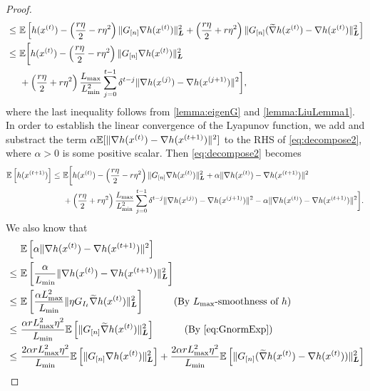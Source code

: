 \begin{proof}
\begin{align}
        ~\leq~&\mathbb{E}\left[ h(x^{(t)}) - \left( \frac{r \eta }{2} - r \eta^2 \right) \| G_{[n]} \nabla h(x^{(t)}) \|_{\boldsymbol{L}}^2 + \left( \frac{r \eta}{2} + r \eta^2 \right) \| G_{[n]} ( \widetilde{\nabla} h(x^{(t)}) - \nabla h(x^{(t)} ) \|_{\boldsymbol{L}}^2 \right] \nonumber \\
        ~\leq~&\mathbb{E}\bigg[ h(x^{(t)}) - \left( \frac{r \eta }{2} - r \eta^2 \right) \| G_{[n]} \nabla h(x^{(t)}) \|_{\boldsymbol{L}}^2 \nonumber
        \\&+ \left( \frac{r \eta}{2} + r \eta^2 \right) \frac{L_{\max}}{L_{\min}^2} \sum_{j=0}^{t-1} \delta^{t-j} \| \nabla h(x^{(j)}) - {\nabla} h(x^{(j+1)}) \|^2 \bigg], \label{eq:decompose2}
    \end{align}
    where the last inequality follows from \autoref{lemma:eigenG} and \autoref{lemma:LiuLemma1}. In order to establish the linear convergence of the Lyapunov function, we add and substract the term $\alpha \mathbb{E}[ \| \nabla h(x^{(t)}) - {\nabla} h(x^{(t+1)}) \|^2 ]$ to the RHS of \eqref{eq:decompose2}, where $\alpha > 0$ is some positive scalar. Then \eqref{eq:decompose2} becomes
    \begin{align}
        \mathbb{E}\left[ h(x^{(t+1)}) \right] \leq~ &\mathbb{E}\bigg[ h(x^{(t)}) - \left( \frac{r \eta }{2} - r \eta^2 \right) \| G_{[n]} \nabla h(x^{(t)}) \|_{\boldsymbol{L}}^2 + \alpha \| \nabla h(x^{(t)}) - {\nabla} h(x^{(t+1)}) \|^2 \nonumber \\
        &+ \left( \frac{r \eta}{2} + r \eta^2 \right) \frac{L_{\max}}{L_{\min}^2} \sum_{j=0}^{t-1} \delta^{t-j} \| \nabla h(x^{(j)}) - {\nabla} h(x^{(j+1)}) \|^2 - \alpha \| \nabla h(x^{(t)}) - {\nabla} h(x^{(t+1)}) \|^2 \bigg]. \label{eq:decompose3}
    \end{align}
    We also know that
    \begin{align*}
        &\mE \left[ \alpha \| \nabla h(x^{(t)}) - {\nabla} h(x^{(t+1)}) \|^2 \right] \\ 
        ~\leq~&  \mE \left[ \frac{\alpha}{L_{\min}} \| \nabla h(x^{(t)}) - {\nabla} h(x^{(t+1)}) \|_{\bL}^2 \right]  \\
        ~\leq~&  \mE \left[ \frac{\alpha L_{\max}^2}{L_{\min}} \| \eta G_{I_t} \wt{\nabla} h( x^{(t)} )  \|_{\bL}^2 \right]  \qquad \text{(By $L_{\max}$-smoothness of $h$)}  \\
        ~\leq~& \frac{\alpha r L_{\max}^2 \eta^2}{L_{\min}} \mE \left[  \| G_{[n]} \wt{\nabla} h( x^{(t)} )  \|_{\bL}^2 \right] \qquad \text{(By \eqref{eq:GnormExp})} \\
        ~\leq~&  \frac{2 \alpha r L_{\max}^2 \eta^2}{L_{\min}} \mE \left[ \| G_{[n]} \nabla h( x^{(t)} ) \|^2_{\bL} \right] + \frac{2 \alpha r L_{\max}^2 \eta^2}{L_{\min}} \mE \left[  \| G_{[n]} ( \wt{\nabla} h( x^{(t)} ) - \nabla h( x^{(t)} ) ) \|^2_{\bL}  \right] \\

\end{align*}
\end{proof}
